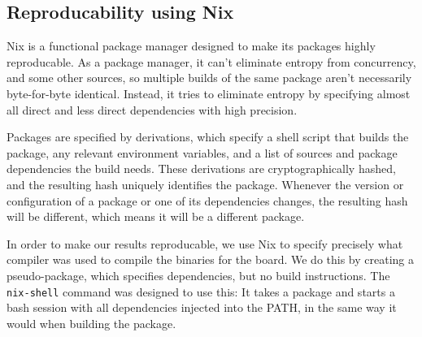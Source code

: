 \subsection{Reproducability using Nix}

Nix\cite{nix} is a functional package manager designed to make its packages
highly reproducable. As a package manager, it can't eliminate entropy from
concurrency, and some other sources, so multiple builds of the same package
aren't necessarily byte-for-byte identical. Instead, it tries to eliminate
entropy by specifying almost all direct and less direct dependencies with high
precision.

Packages are specified by derivations, which specify a shell script that
builds the package, any relevant environment variables, and a list of
sources and package dependencies the build needs. These derivations are
cryptographically hashed, and the resulting hash uniquely identifies the
package. Whenever the version or configuration of a package or one of
its dependencies changes, the resulting hash will be different, which
means it will be a different package.

In order to make our results reproducable, we use Nix to specify
precisely what compiler was used to compile the binaries for the board.
We do this by creating a pseudo-package, which specifies dependencies,
but no build instructions. The \texttt{nix-shell} command was designed
to use this: It takes a package and starts a bash session with all
dependencies injected into the PATH, in the same way it would when
building the package.
